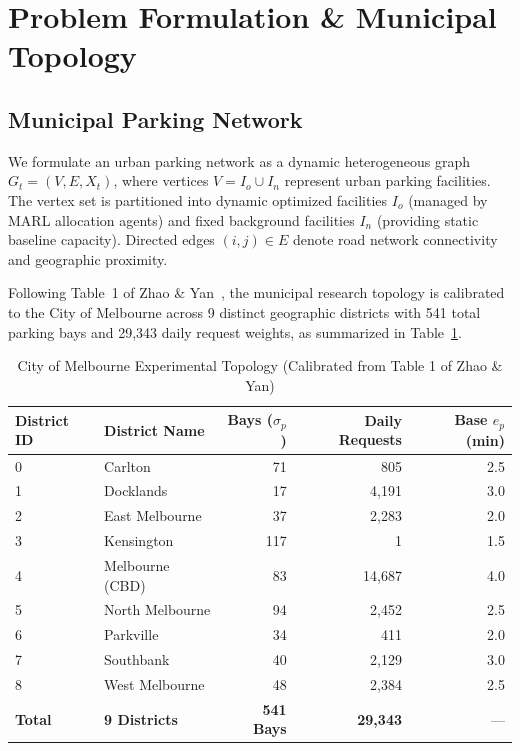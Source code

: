 \documentclass[journal]{IEEEtran}
\begin{document}
\section{Problem Formulation \& Municipal Topology}
\label{sec:formulation}

\subsection{Municipal Parking Network}
We formulate an urban parking network as a dynamic heterogeneous graph $G_t = (V, E, X_t)$, where vertices $V = I_o \cup I_n$ represent urban parking facilities. The vertex set is partitioned into dynamic optimized facilities $I_o$ (managed by MARL allocation agents) and fixed background facilities $I_n$ (providing static baseline capacity). Directed edges $(i, j) \in E$ denote road network connectivity and geographic proximity. 

Following Table~1 of Zhao \& Yan~\cite{zhao2025deep}, the municipal research topology is calibrated to the City of Melbourne across 9 distinct geographic districts with 541 total parking bays and 29,343 daily request weights, as summarized in Table~\ref{tab:melbourne_spec}.

\begin{table}[t]
\caption{City of Melbourne Experimental Topology (Calibrated from Table 1 of Zhao \& Yan)}
\label{tab:melbourne_spec}
\centering
\begin{tabular}{llrrr}
\toprule
\textbf{District ID} & \textbf{District Name} & \textbf{Bays ($\sigma_p$)} & \textbf{Daily Requests} & \textbf{Base $e_p$ (min)} \\
\midrule
0 & Carlton & 71 & 805 & 2.5 \\
1 & Docklands & 17 & 4,191 & 3.0 \\
2 & East Melbourne & 37 & 2,283 & 2.0 \\
3 & Kensington & 117 & 1 & 1.5 \\
4 & Melbourne (CBD) & 83 & 14,687 & 4.0 \\
5 & North Melbourne & 94 & 2,452 & 2.5 \\
6 & Parkville & 34 & 411 & 2.0 \\
7 & Southbank & 40 & 2,129 & 3.0 \\
8 & West Melbourne & 48 & 2,384 & 2.5 \\
\midrule
\textbf{Total} & \textbf{9 Districts} & \textbf{541 Bays} & \textbf{29,343} & --- \\
\bottomrule
\end{tabular}
\end{table}
\end{document}
